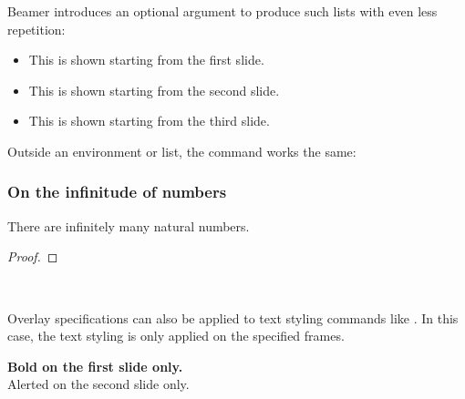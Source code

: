 %
Beamer introduces an optional argument to produce such lists with even less repetition:
%
\begin{ExampleCode}
\begin{itemize}[<+->]
    \item This is shown starting from the first slide.
    \item This is shown starting from the second slide.
    \item This is shown starting from the third slide.
\end{itemize}
\end{ExampleCode}

Outside an environment or list, the  command works the same:
%
\begin{ExampleCode}
\begin{frame}
\frametitle{On the infinitude of numbers}

\begin{corollary}
There are infinitely many natural numbers.
\end{corollary}
\begin{proof}
\end{proof}

\end{frame}
\end{ExampleCode}
%
\begin{center}
~
~
\end{center}

Overlay specifications can also be applied to text styling commands like .
In this case, the text styling is only applied on the specified frames.
%
\begin{ExampleCode}
\begin{frame}

\textbf<1>{Bold on the first slide only.}\\
\alert<2>{Alerted on the second slide only.}

\end{frame}
\end{ExampleCode}
%
\begin{center}
~
\end{center}

